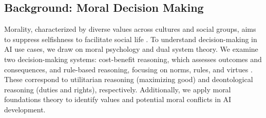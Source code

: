 
\subsection{Background: Moral Decision Making}
\label{ssec:moral-decision-making}
Morality, characterized by diverse values across cultures and social groups, aims to suppress selfishness to facilitate social life \citep{kesebir2010morality}. To understand decision-making in AI use cases, we draw on moral psychology and dual system theory. We examine two decision-making systems: cost-benefit reasoning, which assesses outcomes and consequences, and rule-based reasoning, focusing on norms, rules, and virtues \citep{cushman2013action,cheung2024measuring}. These correspond to utilitarian reasoning (maximizing good) and deontological reasoning (duties and rights), respectively. Additionally, we apply moral foundations theory \citep{graham2008moral} to identify values and potential moral conflicts in AI development.


